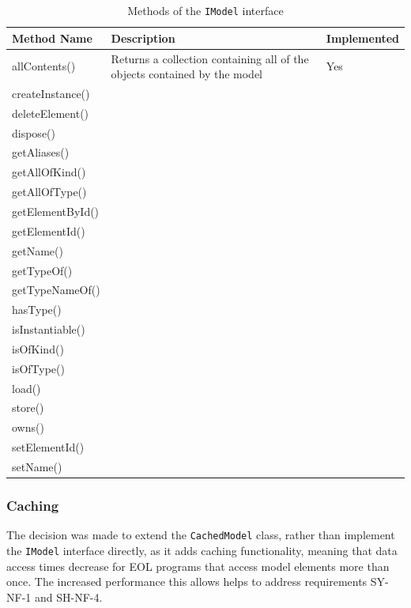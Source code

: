\documentclass[11pt]{book}
\newcommand{\code}[1]{\texttt{#1}}
\begin{document}
\begin{table}[H]
\centering
\begin{longtable}{|p{4cm}|p{8cm}|p{3cm}|}
\hline
\textbf{Method Name} & \textbf{Description} & \textbf{Implemented} \\ \hline
allContents() & Returns a collection containing all of the objects contained by the model & Yes \\ \hline
createInstance() & & \\ \hline
deleteElement() & & \\ \hline
dispose() & & \\ \hline
getAliases() & & \\ \hline
getAllOfKind() & & \\ \hline
getAllOfType() & & \\ \hline
getElementById() & & \\ \hline
getElementId() & &  \\ \hline
getName() & & \\ \hline
getTypeOf() & & \\ \hline
getTypeNameOf() & & \\ \hline
hasType() & & \\ \hline
isInstantiable() & & \\ \hline
isOfKind() & & \\ \hline
isOfType() & & \\ \hline
load() & & \\ \hline
store() & & \\ \hline
owns() & & \\ \hline
setElementId() & & \\ \hline
setName() & & \\ \hline

\end{longtable}
\caption{Methods of the \code{IModel} interface \cite{imodeljavadoc}}
\label{tab:imodel}
\end{table}

\subsubsection{Caching}
The decision was made to extend the \code{CachedModel} class, rather than implement the \code{IModel} interface directly, as it adds caching functionality, meaning that data access times decrease for EOL programs that access model elements more than once. The increased performance this allows helps to address requirements SY-NF-1 and SH-NF-4. \\
\end{document}

